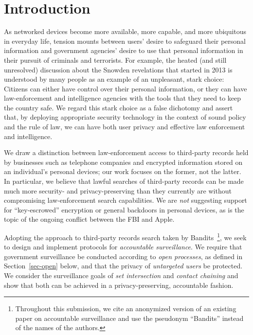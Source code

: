 \section{Introduction}\label{sec-introduction}
As networked devices become more available, more capable, and more ubiquitous
in everyday life, tension mounts between users' desire to safeguard their 
personal information and government agencies' desire to use that personal 
information in their pursuit of criminals and terrorists.  For example, 
the heated (and still unresolved) discussion about the Snowden 
revelations that started in 2013 is understood by many people
as an example of an unpleasant, stark choice: Citizens can either have
control over their personal information, or they can have
law-enforcement and intelligence agencies with the tools that they need to
keep the country safe. We regard this stark choice as a false dichotomy and 
assert that, by deploying appropriate security technology in the context of 
sound policy and the rule of law, we can have both user privacy and effective 
law enforcement and intelligence.

We draw a distinction between law-enforcement access to
third-party records held by businesses such as telephone companies
and encrypted information stored on an individual's personal devices;
our work focuses on the former, not the latter.
In particular, we believe that lawful searches of third-party records
can be made much more security- and privacy-preserving than they currently are
without compromising law-enforcement search capabilities.
We are {\em not} suggesting support for ``key-escrowed'' encryption
or general backdoors in personal devices,
as is the topic of the ongoing conflict between the FBI and Apple.

Adopting the approach to third-party records search
taken by Bandits~\cite{sff-foci2014}\footnote{Throughout this submission, we
cite an anonymized version of an existing paper on accountable surveillance
and use the pseudonym ``Bandits'' instead of the names of the authors.}, we
seek to design and implement protocols for {\it accountable surveillance}.
We require that government surveillance be conducted according to {\it open
processes}, as defined in Section~\ref{sec-open} below, and that the privacy
of {\it untargeted users} be protected.  We consider the surveillance goals
of {\it set intersection} and {\it contact chaining} and show that both can 
be achieved in a privacy-preserving, accountable fashion.

